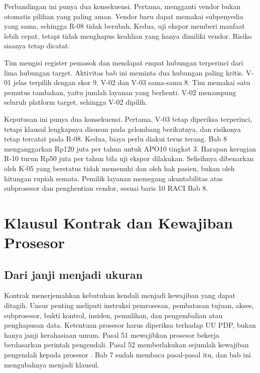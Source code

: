 Perbandingan ini punya dua konsekuensi. Pertama, mengganti vendor bukan otomatis pilihan yang
paling aman. Vendor baru dapat memakai subpenyedia yang sama, sehingga R-08 tidak berubah. Kedua,
uji ekspor memberi manfaat lebih cepat, tetapi tidak menghapus keahlian yang hanya dimiliki vendor.
Risiko sisanya tetap dicatat.

\begin{kasus}[title={Kasus Medikara Health: Lima Hubungan, Dua Prioritas}]
Tim mengisi register pemasok dan mendapat empat hubungan terperinci dari lima hubungan target.
Aktivitas bab ini meminta dua hubungan paling kritis. V-01 jelas terpilih dengan skor 9. V-02 dan
V-03 sama-sama 8. Tim memakai satu pemutus tambahan, yaitu jumlah layanan yang berhenti. V-02
menampung seluruh platform target, sehingga V-02 dipilih.

Keputusan ini punya dua konsekuensi. Pertama, V-03 tetap diperiksa terperinci, tetapi klausul
lengkapnya disusun pada gelombang berikutnya, dan risikonya tetap tercatat pada R-08. Kedua, biaya
perlu diakui terus terang. Bab 8 menganggarkan Rp120 juta per tahun untuk APO10 tingkat 3. Harapan
kerugian R-10 turun Rp50 juta per tahun bila uji ekspor dilakukan. Selisihnya dibenarkan oleh K-05
yang berstatus tidak memenuhi dan oleh hak pasien, bukan oleh hitungan rupiah semata. Pemilik
layanan memegang akuntabilitas atas subprosesor dan penghentian vendor, sesuai baris 10 RACI Bab 8.
\end{kasus}

\section{Klausul Kontrak dan Kewajiban Prosesor}

\subsection*{Dari janji menjadi ukuran}

Kontrak menerjemahkan kebutuhan kendali menjadi kewajiban yang dapat ditagih. Unsur penting meliputi
instruksi pemrosesan, pembatasan tujuan, akses, subprosesor, bukti kontrol, insiden, pemulihan, dan
pengembalian atau penghapusan data. Ketentuan prosesor harus diperiksa terhadap UU PDP, bukan hanya
janji kerahasiaan umum. Pasal 51 mewajibkan prosesor bekerja berdasarkan perintah pengendali. Pasal
52 memberlakukan sejumlah kewajiban pengendali kepada prosesor \cite{uu27-2022-pdp}. Bab 7 sudah
membaca pasal-pasal itu, dan bab ini mengubahnya menjadi klausul.

